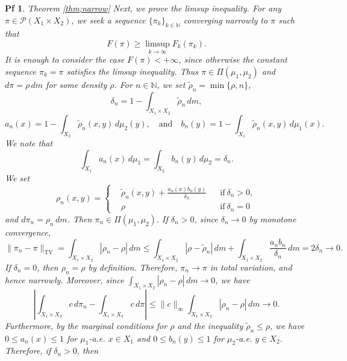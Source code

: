 \documentclass[10pt,a4paper]{amsart}
\newtheorem{pf}{Pf}
\newcommand{\N}{\mathbb N}
\newcommand{\dl}{\delta}
\begin{document}
\begin{pf}{Theorem \ref{thm;narrow}}
Next, we prove the limsup inequality. For any $\pi\in\mathcal P(X_1\times X_2)$, we seek a sequence $\{\pi_k\}_{k\in\N}$ converging narrowly to $\pi$ such that
\begin{equation}\label{limsup;0}
  F(\pi) \geq \limsup_{k \to \infty} F_k(\pi_k).
\end{equation}
It is enough to consider the case $F(\pi)<+\infty$, since otherwise the constant sequence $\pi_k = \pi$ satisfies the limsup inequality. Thus $\pi\in\Pi(\mu_1,\mu_2)$ and $d\pi=\rho\,dm$ for some density $\rho$.
For $n \in \N$, we set $\tilde{\rho}_n = \min\{\rho, n\}$, 
\begin{equation*}
  \dl_n = 1 - \int_{X_1 \times X_2} \tilde{\rho}_n\, dm,
\end{equation*}
\begin{equation*}
a_n(x) = 1 - \int_{X_2} \tilde{\rho}_n(x, y)\, d\mu_2(y), \quad \mathrm{and} \quad b_n(y) = 1 - \int_{X_1} \tilde{\rho}_n(x, y)\, d\mu_1(x). 
\end{equation*}
We note that
\begin{equation*}
\int_{X_1} a_n(x)\, d\mu_1 = \int_{X_2} b_n(y)\, d\mu_2 = \dl_n.
\end{equation*}
We set 
\begin{equation*}
\rho_n(x, y) = \left\{
    \begin{aligned}
    &\tilde{\rho}_n(x, y) + \frac{a_n(x) b_n(y)}{\dl_n}
    && \mathrm{if}\ \dl_n > 0, \\
    &\rho
    && \mathrm{if}\ \dl_n = 0
    \end{aligned}
    \right.
\end{equation*}
and $d\pi_n =\rho_n\,dm$. Then $\pi_n \in \Pi(\mu_1, \mu_2)$. If $\dl_n>0$, since $\dl_n\to0$ by monotone convergence,
\begin{equation*}
\|\pi_n-\pi\|_{\mathrm{TV}} = \int_{X_1\times X_2}|\rho_n-\rho|\,dm \leq \int_{X_1\times X_2} |\rho-\tilde\rho_n| \,dm +\int_{X_1\times X_2}\frac{a_nb_n}{\dl_n}\,dm = 2\dl_n\to0. 
\end{equation*}
If $\dl_n=0$, then $\rho_n=\rho$ by definition. Therefore, $\pi_n\to\pi$ in total variation, and hence narrowly.
Moreover, since $\int_{X_1\times X_2}|\rho_n-\rho|\,dm\to0$, we have
\begin{equation}\label{limsup;2}
\left|\int_{X_1\times X_2}c\,d\pi_n-\int_{X_1\times X_2}c\,d\pi\right|
\leq \|c\|_\infty\int_{X_1\times X_2}|\rho_n-\rho|\,dm\to0.
\end{equation}
Furthermore, by the marginal conditions for $\rho$ and the inequality $\tilde{\rho}_n\leq\rho$, we have $0\leq a_n(x)\leq1$ for $\mu_1$-a.e. $x\in X_1$ and $0\leq b_n(y)\leq1$ for $\mu_2$-a.e. $y\in X_2$. Therefore, if $\dl_n>0$, then

\end{pf}
\end{document}
